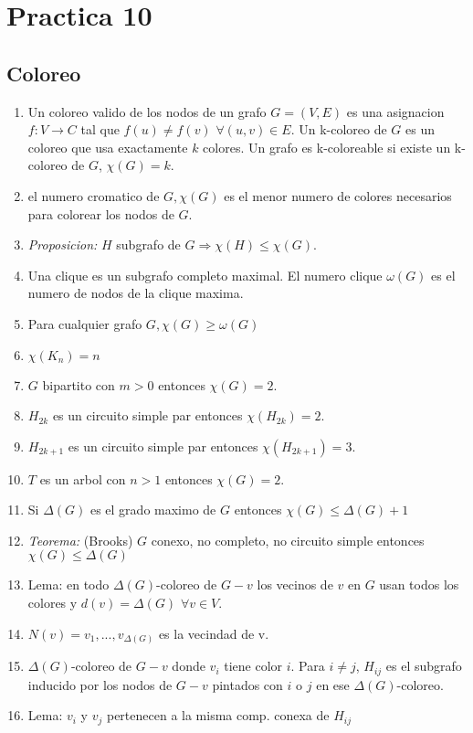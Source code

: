 \section{Practica 10}
\subsection{Coloreo}
\begin{enumerate}
\item Un coloreo valido de los nodos de un grafo $G=(V,E)$ es una asignacion $f:V\rightarrow C$ tal que $f(u) \neq f(v)$ $\forall(u,v)\in E$. Un k-coloreo de $G$ es un coloreo que usa exactamente $k$ colores. Un grafo es k-coloreable si existe un k-coloreo de $G$, $\chi(G)=k$.
\item el numero cromatico de $G, \chi(G)$ es el menor numero de colores necesarios para colorear los nodos de $G$.
\item \textit{Proposicion:} $H$ subgrafo de $G \Rightarrow \chi(H) \leq \chi(G)$.
\item Una clique es un subgrafo completo maximal. El numero clique $\omega(G)$ es el numero de nodos de la clique maxima.
\item Para cualquier grafo $G, \chi(G) \geq \omega(G)$
\item $\chi(K_{n}) = n$
\item $G$ bipartito con $m>0$ entonces $\chi(G) = 2$.
\item $H_{2k}$ es un circuito simple par entonces $\chi(H_{2k}) = 2$.
\item $H_{2k+1}$ es un circuito simple par entonces $\chi(H_{2k+1}) = 3$.
\item $T$ es un arbol con $n>1$ entonces $\chi(G) = 2$.
\item Si $\Delta(G)$ es el grado maximo de $G$ entonces $\chi(G) \leq \Delta(G)+1$
\item \textit{Teorema:} (Brooks) $G$ conexo, no completo, no circuito simple entonces $\chi(G) \leq \Delta(G)$
\item Lema: en todo $\Delta(G)$-coloreo de $G-{v}$ los vecinos de $v$ en $G$ usan todos los colores y $d(v) = \Delta(G)$ $\forall v \in V$.
\item $N(v)={v_{1},...,v_{\Delta(G)}}$ es la vecindad de v.
\item $\Delta(G)$-coloreo de $G-{v}$ donde $v_{i}$ tiene color $i$. Para $i \neq j$, $H_{ij}$ es el subgrafo inducido por los nodos de $G-{v}$ pintados con $i$ o $j$ en ese $\Delta(G)$-coloreo.
\item Lema: $v_{i}$ y $v_{j}$ pertenecen a la misma comp. conexa de $H_{ij}$

\end{enumerate}
